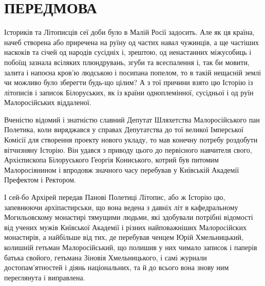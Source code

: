  
 
 
 
 

\section{ПЕРЕДМОВА}


Істориків та Літописців сеї доби було в Малій Росії задосить. Але як ця країна,
начеб створена або приречена на руїну од частих навал чужинців, а ще частіших
наскоків та січей од народів сусідніх і, зрештою, од ненастанних міжусобиць і
побоїщ зазнала всіляких плюндрувань, згуби та всеспалення і, так би мовити,
залита і напоєна кров'ю людською і посипана попелом, то в такій нещасній землі
чи можливо було зберегти будь-що цілим? А з тої причини взято цю Історію із
літописів і записок Білоруських, як із країни одноплемінної, сусідньої і од
руїн Малоросійських віддаленої.

Вченістю відомий і знатністю славний Депутат Шляхетства Малоросійського пан
Полетика, коли виряджався у справах Депутатства до тої великої Імперської
Комісії для створення проекту нового укладу, то мав конечну потребу роздобути
вітчизняну Історію. Він удався з приводу цього до первісного навчителя свого,
Архієпископа Білоруського Георгія Кониського, котрий був питомим Малоросіянином
і впродовж значного часу перебував у Київській Академії Префектом і Ректором.

І сей-бо Архірей передав Панові Полетиці Літопис, або ж Історію цю, запевнюючи
архіпастирськи, що вона ведена з давніх літ в кафедральному Могильовскому
монастирі тямущими людьми, які здобували потрібні відомості від учених мужів
Київської Академії і різних найповажніших Малоросійских монастирів, а найбільше
від тих, де перебував ченцем Юрій Хмельницький, колишній гетьман
Малоросійський, що полишив у них чимало записок і паперів батька свойого,
гетьмана Зіновія Хмельницького, і самі журнали достопам'ятностей і діянь
національних, та й до всього вона знову ним переглянута і виправлена.

